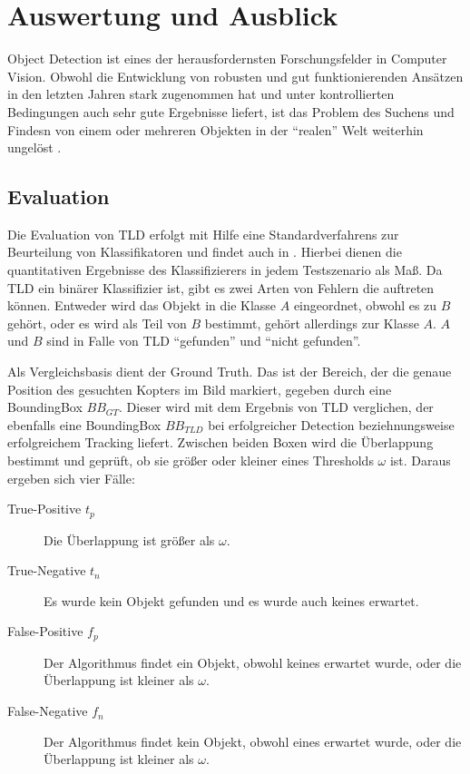 \section{Auswertung und Ausblick}
	Object Detection ist eines der herausfordernsten Forschungsfelder in Computer Vision. Obwohl die Entwicklung von robusten und gut funktionierenden Ansätzen in den letzten Jahren stark zugenommen hat und unter kontrollierten Bedingungen auch sehr gute Ergebnisse liefert, ist das Problem des Suchens und Findesn von einem oder mehreren Objekten in der ``realen'' Welt weiterhin ungelöst \cite{ODS}.

\subsection{Evaluation}
	Die Evaluation von TLD erfolgt mit Hilfe eine Standardverfahrens zur Beurteilung von Klassifikatoren und findet auch in \cite{TLD}. Hierbei dienen die quantitativen Ergebnisse des Klassifizierers in jedem Testszenario als Maß. Da TLD ein binärer Klassifizier ist, gibt es zwei Arten von Fehlern die auftreten können. Entweder wird das Objekt in die Klasse $A$ eingeordnet, obwohl es zu $B$ gehört, oder es wird als Teil von $B$ bestimmt, gehört allerdings zur Klasse $A$. $A$ und $B$ sind in Falle von TLD ``gefunden'' und ``nicht gefunden''.
	
	Als Vergleichsbasis dient der Ground Truth. Das ist der Bereich, der die genaue Position des gesuchten Kopters im Bild markiert, gegeben durch eine BoundingBox $BB_{GT}$. Dieser wird mit dem Ergebnis von TLD verglichen, der ebenfalls eine BoundingBox $BB_{TLD}$ bei erfolgreicher Detection beziehnungsweise erfolgreichem Tracking liefert. Zwischen beiden Boxen wird die Überlappung bestimmt und geprüft, ob sie größer oder kleiner eines Thresholds $\omega$ ist. Daraus ergeben sich vier Fälle:

	\begin{description}
		\item [True-Positive $t_p$] Die Überlappung ist größer als $\omega$.
		\item [True-Negative $t_n$] Es wurde kein Objekt gefunden und es wurde auch keines erwartet.
		\item [False-Positive $f_p$] Der Algorithmus findet ein Objekt, obwohl keines erwartet wurde, oder die Überlappung ist kleiner als $\omega$.
		\item [False-Negative $f_n$] Der Algorithmus findet kein Objekt, obwohl eines erwartet wurde, oder die Überlappung ist kleiner als $\omega$.
	\end{description}


